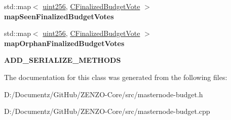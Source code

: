 \begin{DoxyCompactItemize}
\item 
\mbox{\label{class_c_budget_manager_aecbf6ad23e6f6044672d5619d3e7c40d}} 
std\+::map$<$ \mbox{\hyperlink{classuint256}{uint256}}, \mbox{\hyperlink{class_c_finalized_budget_vote}{C\+Finalized\+Budget\+Vote}} $>$ {\bfseries map\+Seen\+Finalized\+Budget\+Votes}
\item 
\mbox{\label{class_c_budget_manager_ad0d6a72545f4057ff5ffba11fc122ac7}} 
std\+::map$<$ \mbox{\hyperlink{classuint256}{uint256}}, \mbox{\hyperlink{class_c_finalized_budget_vote}{C\+Finalized\+Budget\+Vote}} $>$ {\bfseries map\+Orphan\+Finalized\+Budget\+Votes}
\item 
\mbox{\label{class_c_budget_manager_a078aded2505dc7329f29b0bd240b1649}} 
{\bfseries A\+D\+D\+\_\+\+S\+E\+R\+I\+A\+L\+I\+Z\+E\+\_\+\+M\+E\+T\+H\+O\+DS}
\end{DoxyCompactItemize}


The documentation for this class was generated from the following files\+:\begin{DoxyCompactItemize}
\item 
D\+:/\+Documentz/\+Git\+Hub/\+Z\+E\+N\+Z\+O-\/\+Core/src/masternode-\/budget.\+h\item 
D\+:/\+Documentz/\+Git\+Hub/\+Z\+E\+N\+Z\+O-\/\+Core/src/masternode-\/budget.\+cpp\end{DoxyCompactItemize}
